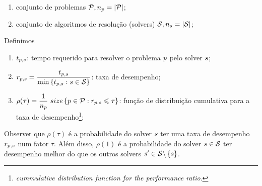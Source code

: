 \begin{enumerate}
    \item conjunto de problemas $\mathcal{P}, n_p = |\mathcal{P}|$;
    \item conjunto de algoritmos de resolução (solvers) $\mathcal{S}, n_s = |\mathcal{S}|$;
\end{enumerate}
Definimos
\begin{enumerate}
    \item $t_{p,s}$: tempo requerido para resolver o problema $p$ pelo solver $s$;
    \item $r_{p,s} = \dfrac{t_{p,s}}{\min\left\{t_{p,s} : s \in \mathcal{S}\right\}}$: taxa de desempenho;
    \item $\rho(\tau) = \dfrac{1}{\nproblem} \ size\Set{\problem \in \problemSet : \performanceratio \leqslant \tau}$: função de distribuição cumulativa para a taxa de desempenho\footnote{\textit{cummulative distribution function for the performance ratio}.};
\end{enumerate}

Observer que $\rho(\tau)$ é a probabilidade do solver $s$ ter uma taxa de desempenho $r_{p,s}$ num fator $\tau$. Além disso, $\rho(1)$ é a probabilidade do solver $s \in \mathcal{S}$ ter desempenho melhor do que os outros solvers $s' \in \mathcal{S}\backslash\left\{s\right\}$.
